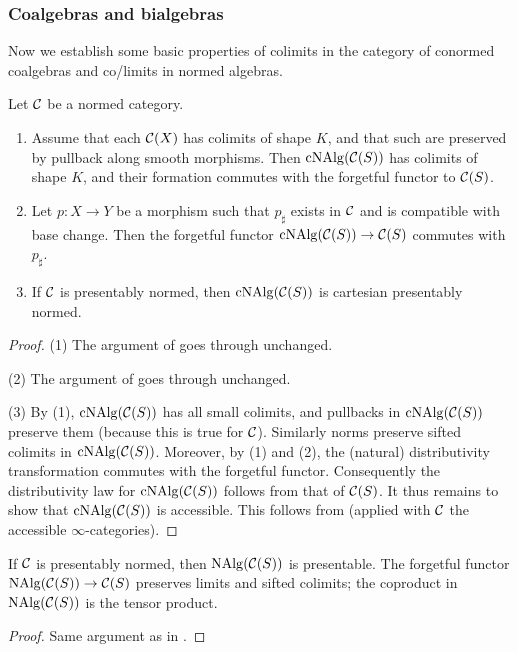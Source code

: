 \documentclass{amsart}
\numberwithin{proposition}{section}
\numberwithin{equation}{section}
\def\cNAlg{\mathrm{cNAlg}}
\begin{document}
\subsubsection{Coalgebras and bialgebras}
Now we establish some basic properties of colimits in the category of conormed coalgebras and co/limits in normed algebras.
\begin{lemma} \label{lemm:cNAlg-basics}
Let $\mathcal C$ be a normed category.
\begin{enumerate}
\item Assume that each $\mathcal C(X)$ has colimits of shape $K$, and that such are preserved by pullback along smooth morphisms.
  Then $\cNAlg(\scr C(S))$ has colimits of shape $K$, and their formation commutes with the forgetful functor to $\mathcal C(S)$.
\item Let $p: X \to Y$ be a morphism such that $p_\sharp$ exists in $\mathcal C$ and is compatible with base change.
  Then the forgetful functor $\cNAlg(\scr C(S)) \to \scr C(S)$ commutes with $p_\sharp$.
\item If $\mathcal C$ is presentably normed, then $\cNAlg(\scr C(S))$ is cartesian presentably normed.
\end{enumerate}
\end{lemma}
\begin{proof}
(1) The argument of \cite[Proposition 7.6(3)]{bachmann-norms} goes through unchanged.

(2) The argument of \cite[Theorem 8.2]{bachmann-norms} goes through unchanged.

(3) By (1), $\cNAlg(\scr C(S))$ has all small colimits, and pullbacks in $\cNAlg(\scr C(S))$ preserve them (because this is true for $\mathcal C$).
Similarly norms preserve sifted colimits in $\cNAlg(\scr C(S))$.
Moreover, by (1) and (2), the (natural) distributivity transformation commutes with the forgetful functor.
Consequently the distributivity law for $\cNAlg(\scr C(S))$ follows from that of $\mathcal C(S)$.
It thus remains to show that $\cNAlg(\scr C(S))$ is accessible.
This follows from \cite[Proposition 5.4.7.11]{lurie-htt} (applied with $\mathcal C$ the accessible $\infty$-categories).
\end{proof}

\begin{lemma} \label{lemm:NAlg-basics}
If $\mathcal C$ is presentably normed, then $\mathrm{NAlg}(\mathcal C(S))$ is presentable.
  The forgetful functor $\mathrm{NAlg}(\mathcal C(S)) \to \mathcal C(S)$ preserves limits and sifted colimits; the coproduct in $\mathrm{NAlg}(\mathcal C(S))$ is the tensor product.
\end{lemma}
\begin{proof}
Same argument as in \cite[Theorem 8.2]{bachmann-norms}.
\end{proof}
\end{document}
